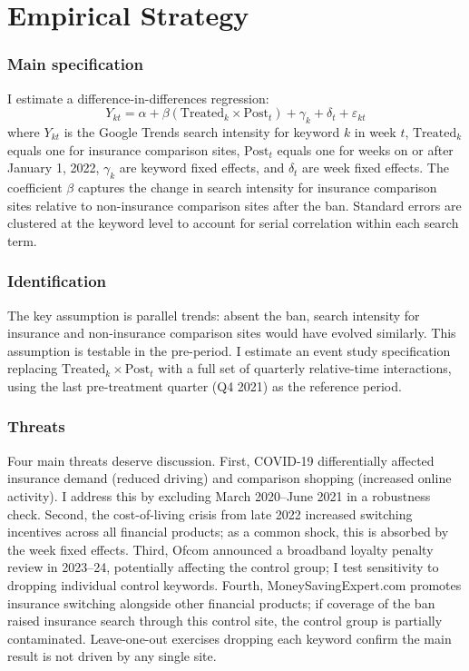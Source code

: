 \documentclass[12pt]{article}
\begin{document}


\section{Empirical Strategy}
\label{sec:empirics}

\subsubsection*{Main specification} I estimate a difference-in-differences regression:
\begin{equation}
Y_{kt} = \alpha + \beta(\text{Treated}_k \times \text{Post}_t) + \gamma_k + \delta_t + \varepsilon_{kt}
\label{eq:did}
\end{equation}
where $Y_{kt}$ is the Google Trends search intensity for keyword $k$ in week $t$, $\text{Treated}_k$ equals one for insurance comparison sites, $\text{Post}_t$ equals one for weeks on or after January 1, 2022, $\gamma_k$ are keyword fixed effects, and $\delta_t$ are week fixed effects. The coefficient $\beta$ captures the change in search intensity for insurance comparison sites relative to non-insurance comparison sites after the ban. Standard errors are clustered at the keyword level to account for serial correlation within each search term.

\subsubsection*{Identification} The key assumption is parallel trends: absent the ban, search intensity for insurance and non-insurance comparison sites would have evolved similarly. This assumption is testable in the pre-period. I estimate an event study specification replacing $\text{Treated}_k \times \text{Post}_t$ with a full set of quarterly relative-time interactions, using the last pre-treatment quarter (Q4 2021) as the reference period.

\subsubsection*{Threats} Four main threats deserve discussion. First, COVID-19 differentially affected insurance demand (reduced driving) and comparison shopping (increased online activity). I address this by excluding March 2020--June 2021 in a robustness check. Second, the cost-of-living crisis from late 2022 increased switching incentives across all financial products; as a common shock, this is absorbed by the week fixed effects. Third, Ofcom announced a broadband loyalty penalty review in 2023--24, potentially affecting the control group; I test sensitivity to dropping individual control keywords. Fourth, MoneySavingExpert.com promotes insurance switching alongside other financial products; if coverage of the ban raised insurance search through this control site, the control group is partially contaminated. Leave-one-out exercises dropping each keyword confirm the main result is not driven by any single site.
\end{document}
